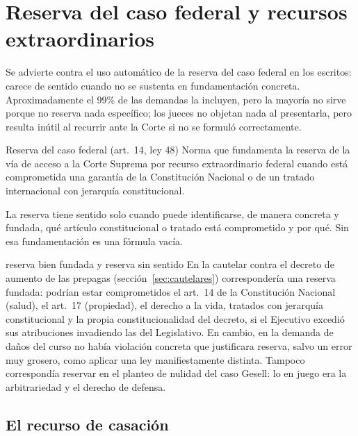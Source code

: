 \documentclass[12pt,oneside]{book}
\begin{document}
\section{Reserva del caso federal y recursos extraordinarios}\label{sec:reserva-federal}

Se advierte contra el uso automático de la reserva del caso federal en los escritos: carece de sentido cuando no se sustenta en fundamentación concreta. Aproximadamente el 99\% de las demandas la incluyen, pero la mayoría no sirve porque no reserva nada específico; los jueces no objetan nada al presentarla, pero resulta inútil al recurrir ante la Corte si no se formuló correctamente.

\begin{definicion}{Reserva del caso federal (art.~14, ley 48)}
Norma que fundamenta la reserva de la vía de acceso a la Corte Suprema por recurso extraordinario federal cuando está comprometida una garantía de la Constitución Nacional o de un tratado internacional con jerarquía constitucional.
\end{definicion}

\begin{importante}
La reserva tiene sentido solo cuando puede identificarse, de manera concreta y fundada, qué artículo constitucional o tratado está comprometido y por qué. Sin esa fundamentación es una fórmula vacía.
\end{importante}

\begin{ejemplo}{reserva bien fundada y reserva sin sentido}
En la cautelar contra el decreto de aumento de las prepagas (sección~\ref{sec:cautelares}) correspondería una reserva fundada: podrían estar comprometidos el art.~14 de la Constitución Nacional (salud), el art.~17 (propiedad), el derecho a la vida, tratados con jerarquía constitucional y la propia constitucionalidad del decreto, si el Ejecutivo excedió sus atribuciones invadiendo las del Legislativo. En cambio, en la demanda de daños del curso no había violación concreta que justificara reserva, salvo un error muy grosero, como aplicar una ley manifiestamente distinta. Tampoco correspondía reservar en el planteo de nulidad del caso Gesell: lo en juego era la arbitrariedad y el derecho de defensa.
\end{ejemplo}

\subsection{El recurso de casación}
\end{document}

